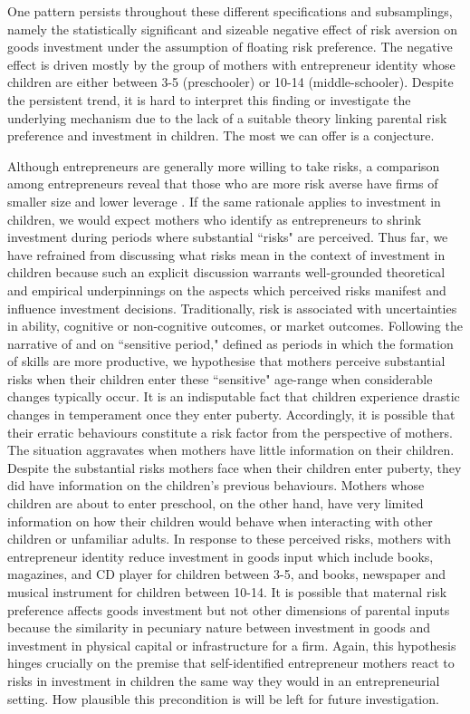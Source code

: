 \documentclass[emulatestandardclasses, 10pt, abstract = true]{scrartcl}
\begin{document}
One pattern persists throughout these different specifications and subsamplings, namely the statistically significant and sizeable negative effect of risk aversion on goods investment under the assumption of floating risk preference. The negative effect is driven mostly by the group of mothers with entrepreneur identity whose children are either between 3-5 (preschooler) or 10-14 (middle-schooler). Despite the persistent trend, it is hard to interpret this finding or investigate the underlying mechanism due to the lack of a suitable theory linking parental risk preference and investment in children. The most we can offer is a conjecture. 

Although entrepreneurs are generally more willing to take risks, a comparison among entrepreneurs reveal that those who are more risk averse have firms of smaller size and lower leverage \citep{herranz2015entrepreneurs}. If the same rationale applies to investment in children, we would expect mothers who identify as entrepreneurs to shrink investment during periods where substantial ``risks" are perceived. Thus far, we have refrained from discussing what risks mean in the context of investment in children because such an explicit discussion warrants well-grounded theoretical and empirical underpinnings on the aspects which perceived risks manifest and influence investment decisions. Traditionally, risk is associated with uncertainties in ability, cognitive or non-cognitive outcomes, or market outcomes. Following the narrative of \citet{knudsen2006economic} and \citet{cunha2007technology} on ``sensitive period," defined as periods in which the formation of skills are more productive, we hypothesise that mothers perceive substantial risks when their children enter these ``sensitive" age-range when considerable changes typically occur. It is an indisputable fact that children experience drastic changes in temperament once they enter puberty. Accordingly, it is possible that their erratic behaviours constitute a risk factor from the perspective of mothers. The situation aggravates when mothers have little information on their children. Despite the substantial risks mothers face when their children enter puberty, they did have information on the children's previous behaviours. Mothers whose children are about to enter preschool, on the other hand, have very limited information on how their children would behave when interacting with other children or unfamiliar adults. In response to these perceived risks, mothers with entrepreneur identity reduce investment in goods input which include books, magazines, and CD player for children between 3-5, and books, newspaper and musical instrument for children between 10-14. It is possible that maternal risk preference affects goods investment but not other dimensions of parental inputs because the similarity in pecuniary nature between investment in goods and investment in physical capital or infrastructure for a firm. Again, this hypothesis hinges crucially on the premise that self-identified entrepreneur mothers react to risks in investment in children the same way they would in an entrepreneurial setting. How plausible this precondition is will be left for future investigation.    
\end{document}
